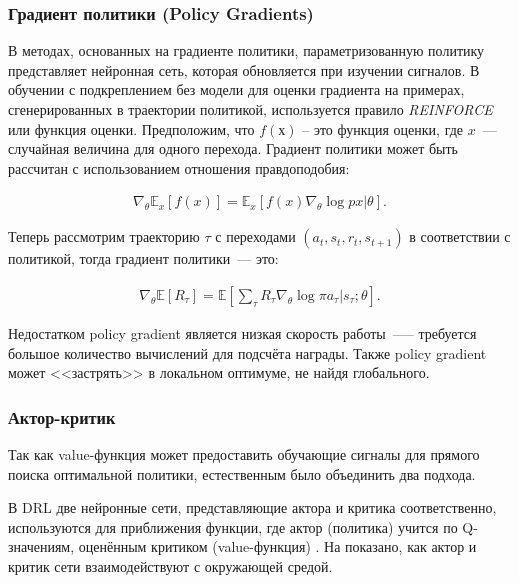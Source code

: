 \subsubsection{Градиент политики (Policy Gradients)}

В методах, основанных на градиенте политики, параметризованную политику представляет нейронная сеть, которая обновляется при изучении сигналов. В обучении с подкреплением без модели для оценки градиента на примерах, сгенерированных в траектории политикой, используется правило {\itshape REINFORCE} или функция оценки. Предположим, что $f(х)$ – это функция оценки, где $x$~--- случайная величина для одного перехода. Градиент политики может быть рассчитан с использованием отношения правдоподобия:

\begin{equation}
    \label{eq:ch1-likelihood-ratios}
    \begin{multlined}
        \nabla_\theta \mathbb{E}_x[f(x)] = \mathbb{E}_x[f(x) \nabla_\theta \log p x|\theta].
    \end{multlined}
\end{equation}

Теперь рассмотрим траекторию $\tau$ с переходами $(a_t, s_t, r_t, s_{t+1})$ в соответствии с политикой, тогда градиент политики~--- это:

\begin{equation}
    \label{eq:ch1-likelihood-ratios}
    \begin{multlined}
        \nabla_\theta \mathbb{E}[R_\tau] = \mathbb{E}[\sum_\tau R_\tau \nabla_\theta \log \pi {a_\tau|s_\tau;\theta}].
    \end{multlined}
\end{equation}

Недостатком policy gradient является низкая скорость работы~—-- требуется большое количество вычислений для подсчёта награды. Также policy gradient может <<застрять>> в локальном оптимуме, не найдя глобального.

\subsubsection{Актор-критик}

Так как value-функция может предоставить обучающие сигналы для прямого поиска оптимальной политики, естественным было объединить два подхода.

В DRL две нейронные сети, представляющие актора и критика соответственно, используются для приближения функции, где актор (политика) учится по Q-значениям, оценённым критиком (value-функция) \cite{Arulkumaran_2017}. На  показано, как актор и критик сети взаимодействуют с окружающей средой.

